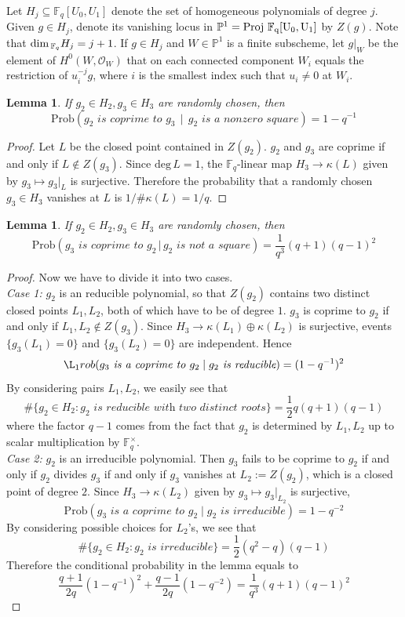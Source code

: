 \documentclass[12pt]{article}
\theoremstyle{plain}
\newtheorem{lemma}[equation]{Lemma}
\theoremstyle{definition}
\newcommand{\IF}{\mathbb{F}}
\newcommand{\IP}{\mathbb{P}}
\newcommand{\sO}{\mathcal{O}}
\renewcommand{\deg}{\mathrm{deg}\,}
\newcommand{\Proj}{\rm Proj\,}
\renewcommand\dim{{\rm dim\,}}
\newcommand{\<}{\langle}
\renewcommand{\>}{\rangle}
\newcommand{\Prob}{\mathrm{Prob}}
\begin{document}
Let $H_j \subseteq \IF_q[U_0, U_1]$ denote the set of homogeneous polynomials of degree $j$. Given $g \in H_j$, denote its vanishing locus in $\IP^1 = \Proj \, \IF_q[U_0, U_1]$ by $Z(g)$. Note that $\dim_{\IF_q} H_j = j + 1$. If $g \in H_j$ and $W \in \IP^1$ is a finite subscheme, let $g|_W$ be the
element of $H^0(W, \sO_W)$ that on each connected component $W_i$ equals the restriction of $u_i^{-j} g$, where $i$ is the smallest index such that $u_i \neq 0$ at $W_i$. 
\begin{lemma} 
\label{square}
If $g_2 \in H_2, g_3 \in H_3$ are randomly chosen, then
$$ \Prob( g_2 \textit{ is coprime to } g_3 \, \mid \, g_2 \textit{ is a nonzero square}) =  1 - q^{-1}$$ 
\end{lemma}
\begin{proof}
Let $L$ be the closed point contained in $Z(g_2)$. $g_2$ and $g_3$ are coprime if and only if $L \not\in Z(g_3)$. Since $\deg L = 1$, the $\IF_q$-linear map $H_3 \to \kappa(L)$ given by $g_3 \mapsto g_3|_{L}$ is surjective. Therefore the probability that a randomly chosen $g_3 \in H_3$ vanishes at $L$ is $1/ \# \kappa(L) = 1/q$. 
\end{proof}

\begin{lemma}
\label{nonsquare} 
If $g_2 \in H_2, g_3 \in H_3$ are randomly chosen, then 
$$ \Prob(g_3 \textit{ is coprime to } g_2 \, | \, g_2 \textit{ is not a square}) = \frac{1}{q^3}(q + 1)(q - 1)^2 $$ 
\end{lemma}
\begin{proof}
Now we have to divide it into two cases. \\
\textit{Case 1:} $g_2$ is an reducible polynomial, so that $Z(g_2)$ contains two distinct closed points $L_1, L_2$, both of which have to be of degree $1$. $g_3$ is coprime to $g_2$ if and only if $L_1, L_2 \not\in Z(g_3)$. Since $H_3 \to \kappa(L_1) \oplus \kappa(L_2)$ is surjective, events $\{ g_3(L_1) = 0\} $ and $\{ g_3(L_2) = 0 \}$ are independent. Hence
$$\L_1rob(g_3 \textit{ is a coprime to }g_2 \mid g_2 \textit{ is reducible}) = (1 - q^{-1})^2 $$ By considering pairs $L_1, L_2$, we easily see that 
$$ \# \{ g_2 \in H_2 : g_2 \textit{ is reducible with two distinct roots} \} = \frac{1}{2}q(q + 1)(q - 1)$$
where the factor $q - 1$ comes from the fact that $g_2$ is determined by $L_1, L_2$ up to scalar multiplication by $\IF_q^\times$. \\
\textit{Case 2:} $g_2$ is an irreducible polynomial. Then $g_3$ fails to be coprime to $g_2$ if and only if $g_2$ divides $g_3$ if and only if $g_3$ vanishes at $L_2:= Z(g_2)$, which is a closed point of degree $2$. Since $H_3 \to \kappa(L_2)$ given by $g_3 \mapsto g_3|_{L_2}$ is surjective, 
$$\Prob(g_3 \textit{ is a coprime to }g_2 \mid g_2 \textit{ is irreducible}) = 1 - q^{-2} $$
By considering possible choices for $L_2$'s, we see that 
$$ \# \{ g_2 \in H_2 : g_2 \textit{ is irreducible} \} = \frac{1}{2}(q^2 - q)(q - 1)$$ 
Therefore the conditional probability in the lemma equals to 
$$ \frac{q + 1}{2q} (1 - q^{-1})^2 +  \frac{q - 1}{2q} (1 - q^{-2}) =  \frac{1}{q^3}(q + 1)(q - 1)^2 $$
\end{proof}
\end{document}
